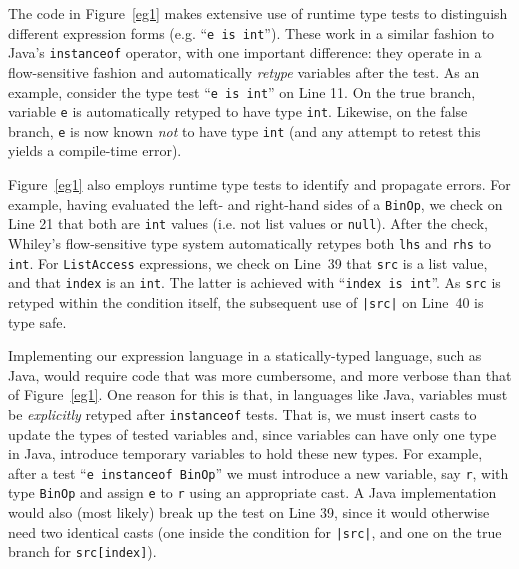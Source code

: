 The code in Figure~\ref{eg1} makes extensive use of runtime type tests
to distinguish different expression forms (e.g.  
``\lstinline{e is int}'').  These work in a similar fashion to Java's
\lstinline{instanceof} operator, with one important difference: they
operate in a flow-sensitive fashion and automatically {\em retype}
variables after the test.  As an example, consider the type test
``\lstinline{e is int}'' on Line 11.  On the true branch, variable
\lstinline{e} is automatically retyped to have type \lstinline{int}.
Likewise, on the false branch, \lstinline{e} is now known {\em not} to
have type \lstinline{int} (and any attempt to retest this yields a
compile-time error).

Figure~\ref{eg1} also employs runtime type tests to identify and
propagate errors.  For example, having evaluated the left- and
right-hand sides of a \lstinline{BinOp}, we check on Line 21 that both
are \lstinline{int} values (i.e. not list values or
\lstinline{null}).  After the check, Whiley's flow-sensitive type
system automatically retypes both \lstinline{lhs} and \lstinline{rhs}
to \lstinline{int}.  For \lstinline{ListAccess} expressions, we check
on Line~39 that \lstinline{src} is a list value, and that
\lstinline{index} is an \lstinline{int}.  The latter is achieved with
``\lstinline{index is int}''.  As \lstinline{src} is retyped within the
condition itself, the subsequent use of \lstinline{|src|} on Line~40
is type safe.

Implementing our expression language in a statically-typed language,
such as Java, would require code that was more cumbersome, and more verbose
than that of Figure~\ref{eg1}.  One reason for this is that, in
languages like Java, variables must be {\em explicitly} retyped after
\lstinline{instanceof} tests.  That is, we must insert casts to update
the types of tested variables and, since variables can have only one
type in Java, introduce temporary variables to hold these new types.
For example, after a test ``\lstinline{e instanceof BinOp}'' we must
introduce a new variable, say \lstinline{r}, with type
\lstinline{BinOp} and assign \lstinline{e} to \lstinline{r} using an
appropriate cast.  A Java implementation would also (most likely)
break up the test on Line 39, since it would otherwise need two
identical casts (one inside the condition for \lstinline{|src|}, and
one on the true branch for \lstinline{src[index]}).

